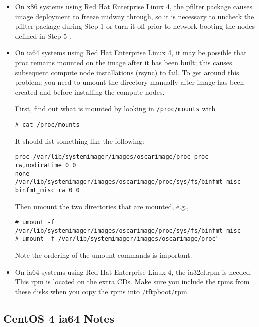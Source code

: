 \begin{itemize}

\item On x86 systems using Red Hat Enterprise Linux 4, the pfilter package 
  causes image deployment to freeze midway through, so it is necessary to
  uncheck the pfilter package during Step 1  or turn it off prior to network booting the nodes defined 
  in Step 5 .

\item On ia64 systems using Red Hat Enterprise Linux 4, it may be possible
  that proc remains mounted
  on the image after it has been built; this causes subsequent compute node
  installations (rsync) to fail.  To get around this problem, you need to
  umount the directory manually after image has been created and before
  installing the compute nodes.
 
  First, find out what is mounted by looking in {\tt /proc/mounts} with
  \begin{verbatim}
# cat /proc/mounts
  \end{verbatim}
  It should list something like the following:
  \begin{verbatim}
proc /var/lib/systemimager/images/oscarimage/proc proc rw,nodiratime 0 0
none /var/lib/systemimager/images/oscarimage/proc/sys/fs/binfmt_misc
binfmt_misc rw 0 0
  \end{verbatim}
  Then umount the two directories that are mounted, e.g.,
  \begin{verbatim}
# umount -f /var/lib/systemimager/images/oscarimage/proc/sys/fs/binfmt_misc
# umount -f /var/lib/systemimager/images/oscarimage/proc"
  \end{verbatim}
  Note the ordering of the umount commands is important.

\item On ia64 systems using Red Hat Enterprise Linux 4, the ia32el.rpm is
  needed.  This rpm is located on the extra CDs.  Make sure you include
  the rpms from these disks when you copy the rpms into /tftpboot/rpm.

\end{itemize}


\subsection{CentOS 4 ia64 Notes}
\label{subsec:centos4notes}

